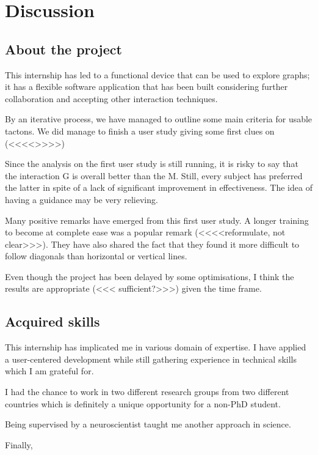 \chapter{Discussion}

\section{About the project}\label{about-the-project}

This internship has led to a functional device that can be used to explore graphs; it has a flexible software application that has been built considering further collaboration and accepting other interaction techniques.

By an iterative process, we have managed to outline some main criteria for usable tactons. We did manage to finish a user study giving some first clues on (<<<<>>>>)

Since the analysis on the first user study is still running, it is risky to say that the interaction G is overall better than the M. Still, every subject has preferred the latter in spite of a lack of significant improvement in effectiveness. The idea of having a guidance may be very relieving.

Many positive remarks have emerged from this first user study. A longer training to become at complete ease was a popular remark (<<<<reformulate, not clear>>>). They have also shared the fact that they found it more difficult to follow diagonals than horizontal or vertical lines. 

Even though the project has been delayed by some optimisations, I think the results are appropriate (<<< sufficient?>>>) given the time frame.


\section{Acquired skills}\label{acquired-skills}

This internship has implicated me in various domain of expertise. I have applied a user-centered development while still gathering experience in technical skills which I am grateful for.

I had the chance to work in two different research groups from two different countries which is definitely a unique opportunity for a non-PhD student.

Being supervised by a neuroscientist taught me another approach in science.

Finally, 

